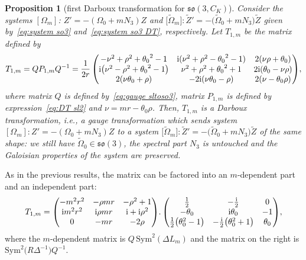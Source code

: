 \documentclass[pdftex]{sigma}%
\numberwithin{equation}{section}
\newtheorem{Proposition}[Theorem]{Proposition}
 { \theoremstyle{definition}
\newtheorem{Definition}[Theorem]{Definition}
\newtheorem{Note}[Theorem]{Note}
\newtheorem{Example}[Theorem]{Example}
\newtheorem{Remark}[Theorem]{Remark} }
\def\Sym{\mathrm{Sym}}
\begin{document}
\begin{Proposition}[first Darboux transformation for $\mathfrak{so}(3, C_K)$]\label{secthdars031}
Consider the systems $[\Omega_m]$\emph{:} $Z' = - (\Omega_0 + mN_3 ) Z$ and $\big[\widetilde{\Omega}_m\big]\colon \widetilde{Z}' = - \big(\widetilde{\Omega}_0 + m N_3 \big) \widetilde{Z}$ given by~\eqref{eq:system so3} and~\eqref{eq:system so3 DT}, respectively.
 Let $T_{1,m}$ be the matrix defined by
\begin{align*}
 T_{1,m} = Q P_{1,m} Q^{-1} =\frac{1}{2 r} \begin{pmatrix}
-{\nu}^{2}+{\rho}^{2}+{\theta_0 }^{2}-1 & {\rm i} ({\nu}^{2}+{\rho}^{2}-{\theta_0}^{2}-1) & 2 (\nu \rho+\theta_0)
\\
{\rm i} \big({\nu}^{2}-{\rho}^{2}+{\theta_0 }^{2}-1\big) &{\nu}^{2}+{\rho}^{2}+{\theta_0 }^{2}+1 & 2 {\rm i} (\theta_0 -\nu \rho)
\\
2 ( \nu \theta_0 +\rho) &-2 {\rm i} (\nu \theta_0 -\rho) &2 ( \nu - \theta_0 \rho) \end{pmatrix}\!,
\end{align*}
where matrix $Q $ is defined by~\eqref{eq:gauge sltoso3},
matrix $P_{1,m}$ is defined by expression~\eqref{eq:DT sl2} and $\nu=mr-\theta_0 \rho$.
Then, $ T_{1,m}$ is a Darboux transformation, i.e., a
gauge transformation which sends system $ [\Omega_m]\colon Z' = - (\Omega_0 + mN_3 ) Z$ to a system $\big[\widetilde{\Omega}_m\big]\colon \widetilde{Z}' = - \big(\widetilde{\Omega}_0 + m {N}_3 \big) \widetilde{Z}$
of the same shape: we still have $\widetilde{\Omega}_0\in \mathfrak{so}(3)$, the spectral part $N_3$ is untouched and the Galoisian properties of the system are preserved.
\end{Proposition}

\begin{Remark}
As in the previous results, the matrix can be factored into an $m$-dependent part and an independent part:
\begin{gather*}
T_{1,m} = \begin{pmatrix} -{m}^{2}{r}^{2}&-\rho mr&-{\rho}^{2}+1
\\ {\rm i}{m}^{2}{r}^{2}&{\rm i}\rho mr&{\rm i}+{\rm i}{\rho}^{2}
\\ 0&-mr&-2 \rho
\end{pmatrix}\!. \begin{pmatrix} \frac{1}{2} &-\frac{\rm i}{2}&0\\ -\theta_{{0}} &{\rm i} \theta_{{0}}&-1\\
\frac{1}{2}\big(\theta_0^{2} -1\big)
&
-\frac{\rm i}{2} \big(\theta_0^{2}+1\big)
&\theta_{{0}}
\end{pmatrix}\!,
\end{gather*}
where the $m$-dependent matrix is
$Q\, \Sym^2(\Delta L_m)$ and the matrix on the right is $\Sym^2\!\big(R \Delta^{-1}\big) Q^{-1}$.
\end{Remark}
\end{document}
